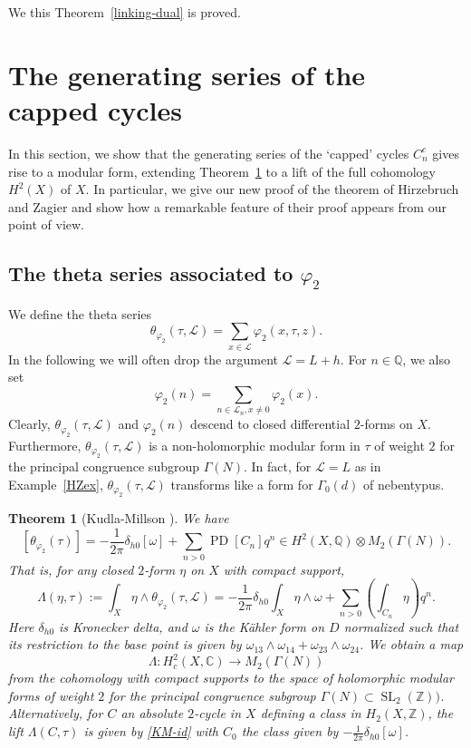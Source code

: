 \documentclass[12pt,leqno]{amsart}
\numberwithin{equation}{section}
\theoremstyle{plain}
\newtheorem{theorem}{Theorem}[section]
\theoremstyle{definition}
\theoremstyle{remark}
\newcommand{\Q}{\mathbb{Q}}
\newcommand{\Z}{\mathbb{Z}}
\newcommand{\C}{\mathbb{C}}
\newcommand{\G}{\Gamma}
\newcommand{\calL}{\mathcal{L}}
\newcommand{\SL}{\operatorname{SL}}
\newcommand{\PD}{\operatorname{PD}}
\begin{document}
We this Theorem~\ref{linking-dual} is proved. 









\section{The generating series of the capped cycles}

In this section, we show that the generating series of the `capped' cycles $C_n^c$ gives rise to a modular form, extending Theorem~\ref{KM90} to a lift of the full cohomology $H^2(X)$ of $X$. In particular, we give our new proof of the theorem of Hirzebruch and Zagier and show how a remarkable feature of their proof appears from our point of view.


\subsection{The theta series associated to $\varphi_2$}

We define the theta series
\[
\theta_{\varphi_2}(\tau,\calL) = \sum_{x \in \calL} \varphi_2(x,\tau,z).
\]
 In the following we will often drop the argument $\calL = L+h$. For $n \in \Q$, we also set 
\[
\varphi_2(n) = \sum_{n \in \calL_n, x \ne0} \varphi_2(x).
\]
Clearly, $\theta_{\varphi_2}(\tau,\calL)$ and $\varphi_2(n)$ descend to closed differential $2$-forms on $X$. Furthermore, $\theta_{\varphi_2}(\tau,\calL)$ is a non-holomorphic modular form in $\tau$ of weight $2$ for the principal congruence subgroup $\G(N)$. In fact, for $\mathcal{L} = L$ as in Example~\ref{HZex}, $\theta_{\varphi_2}(\tau,\calL)$ transforms like a form for $\G_0(d)$ of nebentypus. 

\begin{theorem}[Kudla-Millson \cite{KM90}]\label{KM90}
We have
\[
[\theta_{\varphi_2}(\tau)] =  -\frac{1}{2\pi}\delta_{h0} [\omega] + \sum_{n>0} \PD[C_n] q^n \in H^2(X,\Q) \otimes M_2(\G(N)).
\]
That is, for any closed $2$-form $\eta$ on $X$ with compact support,
\[
\Lambda(\eta,\tau) := \int_X \eta \wedge \theta_{\varphi_2}(\tau,\calL)= -\frac{1}{2\pi}\delta_{h0} \int_X \eta \wedge \omega + \sum_{n>0} \left( \int_{C_n} \eta \right)q^n.
\]
Here $\delta_{h0}$ is Kronecker delta, and $\omega$ is the K{\"a}hler form on $D$ normalized such that its restriction to the base point is given by $\omega_{13}\wedge \omega_{14}+\omega_{23}\wedge \omega_{24}$. 
We obtain a map
\begin{equation}
\Lambda: H_c^{2}(X,\C) \to M_{2}(\G(N))
\end{equation}
from the cohomology with compact supports to the space of holomorphic modular forms of weight $2$ for the principal congruence subgroup $\G(N) \subset \SL_2(\Z))$. Alternatively, for $C$ an absolute $2$-cycle in $X$ defining a class in $H_2(X,\Z)$, the lift $\Lambda(C,\tau)$ is given by \eqref{KM-id} with $C_0$ the class given by $-\frac{1}{2\pi}\delta_{h0} [\omega]$.
\end{theorem}
\end{document}
